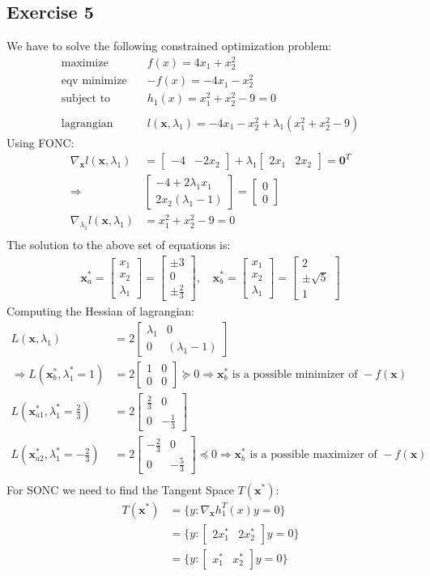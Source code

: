 \documentclass[a4paper,11pt]{article}
\newcommand{\V}[1]{\boldsymbol{#1}}
\newcommand{\mat}[1]{\begin{bmatrix}#1\end{bmatrix}}
\begin{document}
\subsection*{Exercise 5} 
We have to solve the following constrained optimization problem:
\begin{align*}
 \text{maximize} \quad& f(x) = 4x_1 + x_2^2\\
 \text{eqv minimize} \quad& -f(x)= -4x_1 - x_2^2\\
 \text{subject to} \quad& h_1(x) = x_1^2 + x_2^2 -9 = 0\\\\
 \text{lagrangian}\quad& l(\V{x},\lambda_1) =  -4x_1 - x_2^2 + \lambda_1(x_1^2 + x_2^2 -9)
\end{align*}
Using FONC:
\begin{align*}
\nabla_{\V{x}} l(\V{x},\lambda_1) &= 
\mat{-4& -2x_2} + \lambda_1\mat{2x_1& 2x_2} = \V{0}^T\\
\Rightarrow& \mat{-4+2\lambda_1 x_1\\ 2x_2(\lambda_1-1)} = \mat{0\\0}\\
\nabla_{\lambda_1} l(\V{x},\lambda_1) &= 
x_1^2 + x_2^2 -9 = 0\\
\end{align*}
The solution to the above set of equations is:
\begin{align*}
 \V{x}^*_a = \mat{x_1\\x_2\\ \lambda_1} = \mat{\pm3\\ 0\\ \pm\frac{2}{3}} ,\quad
 \V{x}^*_b =\mat{x_1\\x_2\\ \lambda_1} = \mat{2\\ \pm \sqrt{5}\\ 1}
\end{align*}
Computing the Hessian of lagrangian:
\begin{align*}
 L(\V{x},\lambda_1) &= 2\mat{\lambda_1& 0\\0& (\lambda_1-1)}\\
 \Rightarrow L(\V{x}^*_b, \lambda^*_1=  1)&=2\mat{1& 0\\0& 0}\succcurlyeq0 \Rightarrow \V{x}^*_b\text{ is a possible minimizer of  }-f(\V{x})\\
 L(\V{x}^*_{a1}, \lambda^*_1 = \frac{2}{3})&= 2\mat{\frac{2}{3}& 0\\0& -\frac{1}{3}}\\
 L(\V{x}^*_{a2}, \lambda^*_1 = -\frac{2}{3})&= 2\mat{-\frac{2}{3}& 0\\0& -\frac{5}{3}}\preccurlyeq0 \Rightarrow \V{x}^*_b\text{ is a possible maximizer of }-f(\V{x})\\
\end{align*}
For SONC we need to find the Tangent Space $T(\V{x}^*)$:
\begin{align*}
 T(\V{x}^*) & = \{y: \nabla_{\V{x}}h_1^T(x)y = 0   \}\\
 & = \{y: \mat{2x_1^*& 2x_2^*}y = 0   \}\\
 &=\{y: \mat{x_1^*& x_2^*}y = 0   \}
\end{align*}
\end{document}
